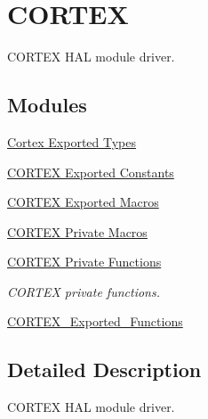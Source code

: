\hypertarget{group___c_o_r_t_e_x}{\section{C\-O\-R\-T\-E\-X}
\label{group___c_o_r_t_e_x}
}


C\-O\-R\-T\-E\-X H\-A\-L module driver.  


\subsection*{Modules}
\begin{DoxyCompactItemize}
\item 
\hyperlink{group___c_o_r_t_e_x___exported___types}{Cortex Exported Types}
\item 
\hyperlink{group___c_o_r_t_e_x___exported___constants}{C\-O\-R\-T\-E\-X Exported Constants}
\item 
\hyperlink{group___c_o_r_t_e_x___exported___macros}{C\-O\-R\-T\-E\-X Exported Macros}
\item 
\hyperlink{group___c_o_r_t_e_x___private___macros}{C\-O\-R\-T\-E\-X Private Macros}
\item 
\hyperlink{group___c_o_r_t_e_x___private___functions}{C\-O\-R\-T\-E\-X Private Functions}
\begin{DoxyCompactList}\small\item\em C\-O\-R\-T\-E\-X private functions. \end{DoxyCompactList}\item 
\hyperlink{group___c_o_r_t_e_x___exported___functions}{C\-O\-R\-T\-E\-X\-\_\-\-Exported\-\_\-\-Functions}
\end{DoxyCompactItemize}


\subsection{Detailed Description}
C\-O\-R\-T\-E\-X H\-A\-L module driver. 